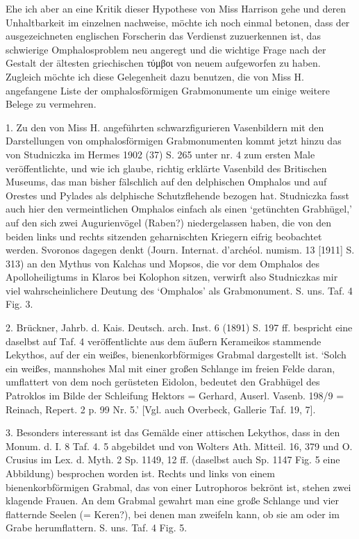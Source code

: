 \documentclass[a4paper, 11pt, oneside]{article}
\begin{document}
Ehe ich aber an eine Kritik dieser Hypothese von Miss Harrison gehe und deren Unhaltbarkeit im einzelnen nachweise, möchte ich noch einmal betonen, dass der ausgezeichneten englischen Forscherin das Verdienst zuzuerkennen ist, das schwierige Omphalosproblem neu angeregt und die wichtige Frage nach der Gestalt der ältesten griechischen τύμβοι von neuem aufgeworfen zu haben. Zugleich möchte ich diese Gelegenheit dazu benutzen, die von Miss H. angefangene Liste der omphalosförmigen Grabmonumente um einige weitere Belege zu vermehren.

1. Zu den von Miss H. angeführten schwarzfigurieren Vasenbildern mit den Darstellungen von omphalosförmigen Grabmonumenten kommt jetzt hinzu das von Studniczka im Hermes 1902 (37) S. 265 unter nr. 4 zum ersten Male veröffentlichte, und wie ich glaube, richtig erklärte Vasenbild des Britischen Museums, das man bisher fälschlich auf den delphischen Omphalos und auf Orestes und Pylades als delphische Schutzflehende bezogen hat. Studniczka fasst auch hier den vermeintlichen Omphalos einfach als einen `getünchten Grabhügel,' auf den sich zwei Augurienvögel (Raben?) niedergelassen haben, die von den beiden links und rechts sitzenden geharnischten Kriegern eifrig beobachtet werden. Svoronos dagegen denkt (Journ. Internat. d'archéol. numism. 13 [1911] S. 313) an den Mythus von Kalchas und Mopsos, die vor dem Omphalos des Apolloheiligtums in Klaros bei Kolophon sitzen, verwirft also Studniczkas mir viel wahrscheinlichere Deutung des `Omphalos' als Grabmonument. S. uns. Taf. 4 Fig. 3.

2. Brückner, Jahrb. d. Kais. Deutsch. arch. Inst. 6 (1891) S. 197 ff. bespricht eine daselbst auf Taf. 4 veröffentlichte aus dem äußern Kerameikos stammende Lekythos, auf der ein weißes, bienenkorbförmiges Grabmal dargestellt ist. `Solch ein weißes, mannshohes Mal mit einer großen Schlange im freien Felde daran, umflattert von dem noch gerüsteten Eidolon, bedeutet den Grabhügel des Patroklos im Bilde der Schleifung Hektors = Gerhard, Auserl. Vasenb. 198/9 = Reinach, Repert. 2 p. 99 Nr. 5.' [Vgl. auch Overbeck, Gallerie Taf. 19, 7].

3. Besonders interessant ist das Gemälde einer attischen Lekythos, dass in den Monum. d. I. 8 Taf. 4. 5 abgebildet und von Wolters Ath. Mitteil. 16, 379 und O. Crusius im Lex. d. Myth. 2 Sp. 1149, 12 ff. (daselbst auch Sp. 1147 Fig. 5 eine Abbildung) besprochen worden ist. Rechts und links von einem bienenkorbförmigen Grabmal, das von einer Lutrophoros bekrönt ist, stehen zwei klagende Frauen. An dem Grabmal gewahrt man eine große Schlange und vier flatternde Seelen (= Keren?), bei denen man zweifeln kann, ob sie am oder im Grabe herumflattern. S. uns. Taf. 4 Fig. 5.
\end{document}
